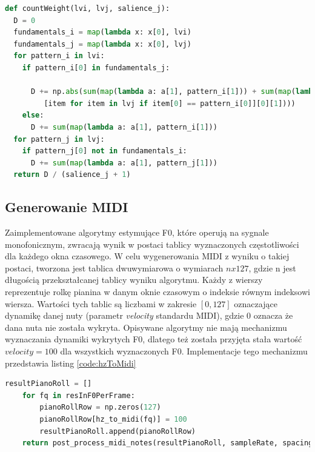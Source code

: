 \documentclass[12pt,a4paper,twoside]{mwart}
\begin{document}
\begin{lstlisting}[language=Python, caption={Funkcja wyliczająca wagę krawędzi w algorytmie śledzenia wysokości nut}, captionpos=b, label={code:petrusPitchTracking}, numbers=none]
def countWeight(lvi, lvj, salience_j):
  D = 0
  fundamentals_i = map(lambda x: x[0], lvi)
  fundamentals_j = map(lambda x: x[0], lvj)
  for pattern_i in lvi:
    if pattern_i[0] in fundamentals_j:
      
      D += np.abs(sum(map(lambda a: a[1], pattern_i[1])) + sum(map(lambda a: a[1],
         [item for item in lvj if item[0] == pattern_i[0]][0][1])))
    else:
      D += sum(map(lambda a: a[1], pattern_i[1]))
  for pattern_j in lvj:
    if pattern_j[0] not in fundamentals_i:
      D += sum(map(lambda a: a[1], pattern_j[1]))
  return D / (salience_j + 1)
\end{lstlisting}

\subsection{Generowanie MIDI}\label{sec:impl:midiGen}
Zaimplementowane algorytmy estymujące F0, które operują na sygnale monofonicznym, zwracają wynik w postaci tablicy wyznaczonych częstotliwości dla każdego okna czasowego. W celu wygenerowania MIDI z wyniku o takiej postaci, tworzona jest tablica dwuwymiarowa o wymiarach $n x 127$, gdzie n jest długością przekształcanej tablicy wyniku algorytmu. Każdy z wierszy reprezentuje rolkę pianina w danym oknie czasowym o indeksie równym indeksowi wiersza. Wartości tych tablic są liczbami w zakresie $\left[0, 127\right]$ oznaczające dynamikę danej nuty (parametr \textit{velocity} standardu MIDI), gdzie 0 oznacza że dana nuta nie została wykryta. Opisywane algorytmy nie mają mechanizmu wyznaczania dynamiki wykrytych F0, dlatego też została przyjęta stała wartość $velocity = 100$ dla wszystkich wyznaczonych F0. Implementacje tego mechanizmu przedstawia listing \ref{code:hzToMidi}

\begin{lstlisting}[language=Python, caption={Funkcja wyliczająca wagę krawędzi w algorytmie śledzenia wysokości nut}, captionpos=b, label={code:hzToMidi}, numbers=none]
	resultPianoRoll = []
	for fq in resInF0PerFrame:
		pianoRollRow = np.zeros(127)
		pianoRollRow[hz_to_midi(fq)] = 100
		resultPianoRoll.append(pianoRollRow)
	return post_process_midi_notes(resultPianoRoll, sampleRate, spacing, 127, 40, 0)
\end{lstlisting}
\end{document}
